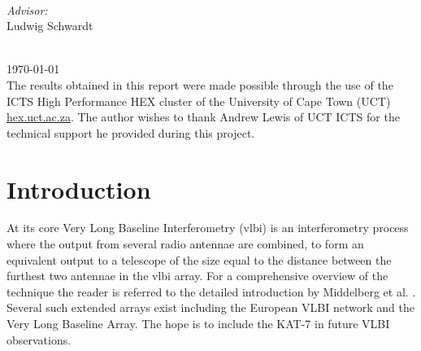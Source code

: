 \documentclass[a4paper,10pt]{article}
\begin{document}
\begin{titlepage}
\begin{minipage}{0.4\textwidth}
\begin{flushleft}
\end{flushleft}
\end{minipage}
~
\begin{minipage}{0.4\textwidth}
\begin{flushright} \large
\emph{Advisor:} \\
Ludwig Schwardt
\end{flushright}
\end{minipage}\\[3cm]



{\large \today}\\[2.5cm] %
{The results obtained in this report were made possible through the use of the ICTS High Performance HEX cluster 
of the University of Cape Town (UCT) \url{hex.uct.ac.za}. The author wishes to thank Andrew Lewis of UCT ICTS for 
the technical support he provided during this project.}


\vfill %

\end{titlepage}

\printglossary[style=long]
\pagebreak
\tableofcontents
\pagebreak
\listoffigures
\listoftables
\pagebreak
\section{Introduction}
At its core Very Long Baseline Interferometry (\gls{vlbi}) is an interferometry process where the output from several radio antennae are 
combined, to form an equivalent output to a telescope of the size equal to the distance between the furthest two antennae in the \gls{vlbi} array.
For a comprehensive overview of the technique the reader is referred to the detailed introduction by Middelberg et al. \cite{middelberg2008high}. Several
such extended arrays exist including the European VLBI network and the Very Long Baseline Array. The hope is to include the KAT-7 in future VLBI
observations.
\end{document}
